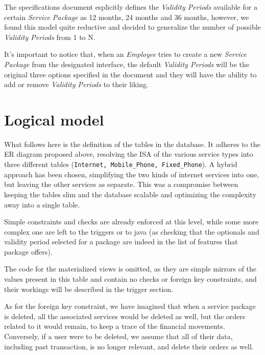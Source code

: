 The specifications document esplicitly defines the \textit{Validity Periods} available for a certain \textit{Service Package} as 12 months, 24 months and 36 months, however, we found this model quite reductive and decided to generalize the number of possible \textit{Validity Periods} from 1 to N.

It's important to notice that, when an \textit{Employee} tries to create a new \textit{Service Package} from the designated interface, the default \textit{Validity Periods} will be the original three options specified in the document and they will have the ability to add or remove \textit{Validity Periods} to their liking.


\section{Logical model}
\label{sec:logical_model}

What follows here is the definition of the tables in the database. It adheres to the ER diagram proposed above, resolving the ISA of the various service types into three different tables (\texttt{Internet, Mobile\_Phone, Fixed\_Phone}). A hybrid approach has been chosen, simplifying the two kinds of internet services into one, but leaving the other services as separate. This was a compromise between keeping the tables slim and the database scalable and optimizing the complexity away into a single table.

Simple constraints and checks are already enforced at this level, while some more complex one are left to the triggers or to java (as checking that the optionals and validity period selected for a package are indeed in the list of features that package offers).

The code for the materialized views is omitted, as they are simple mirrors of the values present in this table and contain no checks or foreign key constraints, and their workings will be described in the trigger section.

As for the foreign key constraint, we have imagined that when a service package is deleted, all the associated services would be deleted as well, but the orders related to it would remain, to keep a trace of the financial movements. Conversely, if a user were to be deleted, we assume that all of their data, including past transaction, is no longer relevant, and delete their orders as well.

